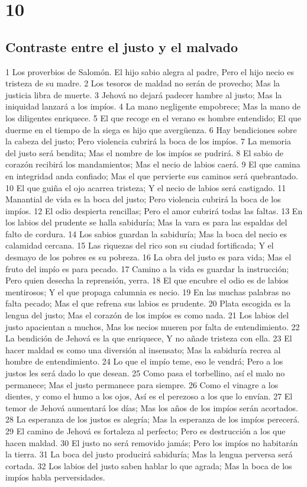 \chapter{10}

\section*{Contraste entre el justo y el malvado}

1 Los proverbios de Salomón.
El hijo sabio alegra al padre,
Pero el hijo necio es tristeza de su madre.
2 Los tesoros de maldad no serán de provecho;
Mas la justicia libra de muerte.
3 Jehová no dejará padecer hambre al justo;
Mas la iniquidad lanzará a los impíos.
4 La mano negligente empobrece;
Mas la mano de los diligentes enriquece.
5 El que recoge en el verano es hombre entendido;
El que duerme en el tiempo de la siega es hijo que avergüenza.
6 Hay bendiciones sobre la cabeza del justo;
Pero violencia cubrirá la boca de los impíos.
7 La memoria del justo será bendita;
Mas el nombre de los impíos se pudrirá.
8 El sabio de corazón recibirá los mandamientos;
Mas el necio de labios caerá.
9 El que camina en integridad anda confiado;
Mas el que pervierte sus caminos será quebrantado.
10 El que guiña el ojo acarrea tristeza;
Y el necio de labios será castigado.
11 Manantial de vida es la boca del justo;
Pero violencia cubrirá la boca de los impíos.
12 El odio despierta rencillas;
Pero el amor cubrirá todas las faltas. 
13 En los labios del prudente se halla sabiduría;
Mas la vara es para las espaldas del falto de cordura.
14 Los sabios guardan la sabiduría;
Mas la boca del necio es calamidad cercana.
15 Las riquezas del rico son su ciudad fortificada;
Y el desmayo de los pobres es su pobreza.
16 La obra del justo es para vida;
Mas el fruto del impío es para pecado.
17 Camino a la vida es guardar la instrucción;
Pero quien desecha la reprensión, yerra.
18 El que encubre el odio es de labios mentirosos;
Y el que propaga calumnia es necio.
19 En las muchas palabras no falta pecado;
Mas el que refrena sus labios es prudente.
20 Plata escogida es la lengua del justo;
Mas el corazón de los impíos es como nada.
21 Los labios del justo apacientan a muchos,
Mas los necios mueren por falta de entendimiento.
22 La bendición de Jehová es la que enriquece,
Y no añade tristeza con ella.
23 El hacer maldad es como una diversión al insensato;
Mas la sabiduría recrea al hombre de entendimiento.
24 Lo que el impío teme, eso le vendrá;
Pero a los justos les será dado lo que desean.
25 Como pasa el torbellino, así el malo no permanece;
Mas el justo permanece para siempre.
26 Como el vinagre a los dientes, y como el humo a los ojos,
Así es el perezoso a los que lo envían.
27 El temor de Jehová aumentará los días;
Mas los años de los impíos serán acortados.
28 La esperanza de los justos es alegría;
Mas la esperanza de los impíos perecerá.
29 El camino de Jehová es fortaleza al perfecto;
Pero es destrucción a los que hacen maldad.
30 El justo no será removido jamás;
Pero los impíos no habitarán la tierra.
31 La boca del justo producirá sabiduría;
Mas la lengua perversa será cortada.
32 Los labios del justo saben hablar lo que agrada;
Mas la boca de los impíos habla perversidades.

